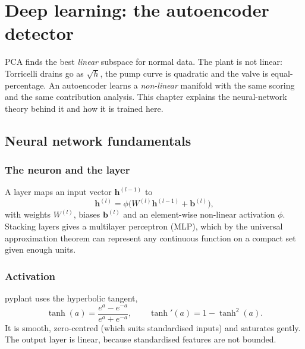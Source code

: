 \chapter{Deep learning: the autoencoder detector}
\label{ch:dl}

PCA finds the best \emph{linear} subspace for normal data. The plant is not
linear: Torricelli drains go as $\sqrt h$, the pump curve is quadratic and the
valve is equal-percentage. An autoencoder learns a \emph{non-linear} manifold
with the same scoring and the same contribution analysis. This chapter
explains the neural-network theory behind it and how it is trained here.

\section{Neural network fundamentals}

\subsection{The neuron and the layer}
A layer maps an input vector $\bm h^{(l-1)}$ to
\begin{equation}
  \bm h^{(l)} = \phi\big(W^{(l)}\bm h^{(l-1)} + \bm b^{(l)}\big),
\end{equation}
with weights $W^{(l)}$, biases $\bm b^{(l)}$ and an element-wise non-linear
activation $\phi$. Stacking layers gives a multilayer perceptron (MLP), which
by the universal approximation theorem can represent any continuous function
on a compact set given enough units.

\subsection{Activation}
pyplant uses the hyperbolic tangent,
\begin{equation}
  \tanh(a) = \frac{e^a - e^{-a}}{e^a + e^{-a}}, \qquad
  \tanh'(a) = 1 - \tanh^2(a).
\end{equation}
It is smooth, zero-centred (which suits standardised inputs) and saturates
gently. The output layer is linear, because standardised features are not
bounded.

